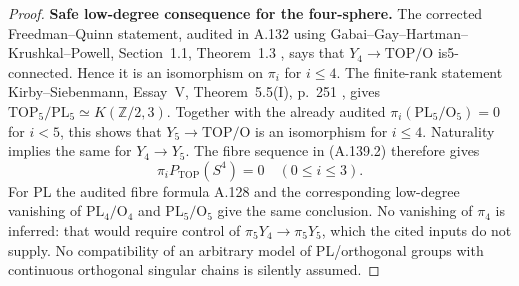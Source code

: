 \begin{proof}
\textbf{Safe low-degree consequence for the four-sphere.}
The corrected Freedman--Quinn statement, audited in A.132 using
Gabai--Gay--Hartman--Krushkal--Powell, Section~1.1, Theorem~1.3
\cite{GabaiGayHartmanKrushkalPowell2026}, says that
$Y_4\to\mathrm{TOP}/\mathrm O$ is5-connected. Hence it is an
isomorphism on $\pi_i$ for $i\le4$. The finite-rank statement
Kirby--Siebenmann, Essay~V, Theorem~5.5(I), p.~251
\cite{KirbySiebenmann1977}, gives
$\mathrm{TOP}_5/\mathrm{PL}_5\simeq K(\mathbb Z/2,3)$.
Together with the already audited
$\pi_i(\mathrm{PL}_5/\mathrm O_5)=0$ for $i<5$, this shows that
$Y_5\to\mathrm{TOP}/\mathrm O$ is an isomorphism for $i\le4$.
Naturality implies the same for $Y_4\to Y_5$.
The fibre sequence in (A.139.2) therefore gives
\[
                \pi_iP_{\mathrm{TOP}}(S^4)=0
                           \quad(0\le i\le3).         \tag{A.139.15}
\]
For PL the audited fibre formula A.128 and the corresponding
low-degree vanishing of $\mathrm{PL}_4/\mathrm O_4$ and
$\mathrm{PL}_5/\mathrm O_5$ give the same conclusion.
No vanishing of $\pi_4$ is inferred: that would require control
of $\pi_5Y_4\to\pi_5Y_5$, which the cited inputs do not supply.
No compatibility of an arbitrary model of PL/orthogonal groups
with continuous orthogonal singular chains is silently assumed.

\end{proof}

